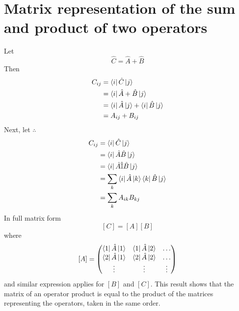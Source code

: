 \section{Matrix representation of the sum and product of two operators}
Let 
\begin{equation}\label{eqn3.75}
\hat{C} = \hat{A} + \hat{B}
\end{equation}
Then
\begin{align}\label{eqn3.76-3.79}
	C_{ij} &= \bra{i} \hat{C} \ket{j}\\
	&= \bra{i} \hat{A} + \hat{B} \ket{j}\\
	&= \bra{i} \hat{A} \ket{j} + \bra{i} \hat{B} \ket{j}\\
	&= A_{ij} + B_{ij}
\end{align}
Next, let
$\therefore$
\begin{align}\label{eqn3.80-3.84}
	C_{ij} &= \bra{i} \hat{C} \ket{j}\\
	&= \bra{i} \hat{A}\hat{B} \ket{j}\\
	&= \bra{i} \hat{A}\hat{\mathbb{I}} \hat{B} \ket{j}\\
	&= \sum_{k} \bra{i} \hat{A}\ket{k} \bra{k} \hat{B} \ket{j}\\
	&= \sum_{k} A_{ik} B_{kj}
\end{align}
In full matrix form
\begin{equation}\label{eqn3.85}
[C] = [A] [B]
\end{equation}
where
\begin{equation}\label{eqn3.86}
[A] = \left(
\begin{matrix}
\bra{1}\hat{A}\ket{1} & \bra{1}\hat{A}\ket{2} & \ldots \\
\bra{2}\hat{A}\ket{1} & \bra{2}\hat{A}\ket{2} & \ldots \\
\vdots & \vdots & \vdots
\end{matrix}
\right)
\end{equation}
and similar expression applies for $[B]$ and $[C]$.
This result shows that the matrix of an operator product is equal to the product of the matrices representing the operators, taken in the same order.


